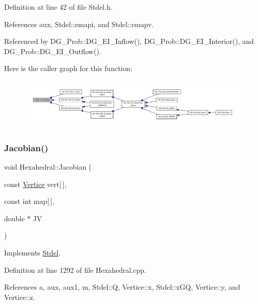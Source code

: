Definition at line 42 of file Stdel.\+h.



References aux, Stdel\+::emapi, and Stdel\+::emapv.



Referenced by D\+G\+\_\+\+Prob\+::\+D\+G\+\_\+\+E\+I\+\_\+\+Inflow(), D\+G\+\_\+\+Prob\+::\+D\+G\+\_\+\+E\+I\+\_\+\+Interior(), and D\+G\+\_\+\+Prob\+::\+D\+G\+\_\+\+E\+I\+\_\+\+Outflow().

Here is the caller graph for this function\+:
\nopagebreak
\begin{figure}[H]
\begin{center}
\leavevmode
\includegraphics[width=350pt]{classStdel_abb022f0ad81707e11e3a3091d2d87c46_icgraph}
\end{center}
\end{figure}
\mbox{\label{classHexahedral_aa12d6d2abce9f0c7f6065e907be71201}} 
\subsubsection{\texorpdfstring{Jacobian()}{Jacobian()}}
{\footnotesize\ttfamily void Hexahedral\+::\+Jacobian (\begin{DoxyParamCaption}\item[{const \hyperlink{structVertice}{Vertice}}]{vert\mbox{[}$\,$\mbox{]},  }\item[{const int}]{map\mbox{[}$\,$\mbox{]},  }\item[{double $\ast$}]{JV }\end{DoxyParamCaption})\hspace{0.3cm}{\ttfamily [virtual]}}



Implements \hyperlink{classStdel_a953ff994c1bb423245aff079932c648f}{Stdel}.



Definition at line 1292 of file Hexahedral.\+cpp.



References a, aux, aux1, m, Stdel\+::Q, Vertice\+::x, Stdel\+::x\+GQ, Vertice\+::y, and Vertice\+::z.

